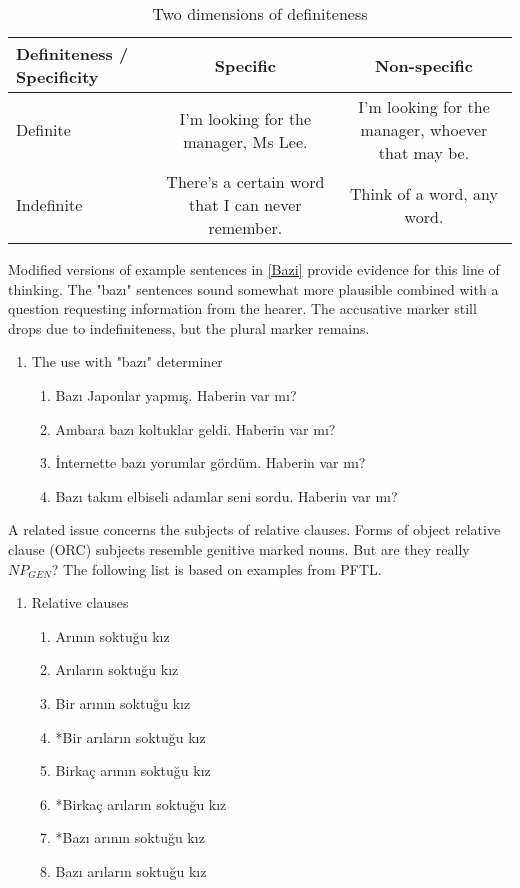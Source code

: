 \documentclass[11pt]{article} %
\begin{document}
\begin{table}[h]
\centering
	\begin{adjustbox}{width=1\textwidth}
    	\begin{tabular}{lcc}
        \hline
		Definiteness / Specificity & Specific & Non-specific\\ \hline
		Definite & I'm looking for the manager, Ms Lee. & I'm looking for the manager, whoever that may be.\\ \hline
		Indefinite & There's a certain word that I can never remember. & Think of a word, any word. \\ \hline
    	\end{tabular}
	\end{adjustbox}
	\caption{Two dimensions of definiteness}
    	\label{tab:TwoDimDef}
\end{table}

Modified versions of example sentences in \ref{Bazi} provide evidence for this line of thinking. The "bazı" sentences sound somewhat more plausible combined with a question requesting information from the hearer. The accusative marker still drops due to indefiniteness, but the plural marker remains.

\begin{enumerate}[resume*] 
	\item The use with "bazı" determiner \label{Bazi}
	\begin{enumerate}[label=(\alph*), ref=(\alph*)]\itemsep1pt
	\item Bazı Japonlar yapmış. Haberin var mı? \label{a}
	\item Ambara bazı koltuklar geldi. Haberin var mı? \label{b}
	\item İnternette bazı yorumlar gördüm. Haberin var mı? \label{c}
	\item Bazı takım elbiseli adamlar seni sordu. Haberin var mı? \label{d}
	\end{enumerate}
\end{enumerate}

A related issue concerns the subjects of relative clauses. Forms of object relative clause (ORC) subjects resemble genitive marked nouns. But are they really $NP_{GEN}$? The following list is based on examples from PFTL. 

\begin{enumerate}[resume*] 
	\item Relative clauses \label{RelCl}
	\begin{enumerate}[label=(\alph*), ref=(\alph*)]\itemsep1pt
	\item Arının soktuğu kız \label{a}
	\item Arıların soktuğu kız \label{b}
	\item Bir arının soktuğu kız \label{c}
	\item *Bir arıların soktuğu kız \label{d}
	\item Birkaç arının soktuğu kız \label{e}
	\item *Birkaç arıların soktuğu kız \label{f}
	\item *Bazı arının soktuğu kız \label{g}
	\item Bazı arıların soktuğu kız \label{h}
	\end{enumerate}
\end{enumerate}
\end{document}
